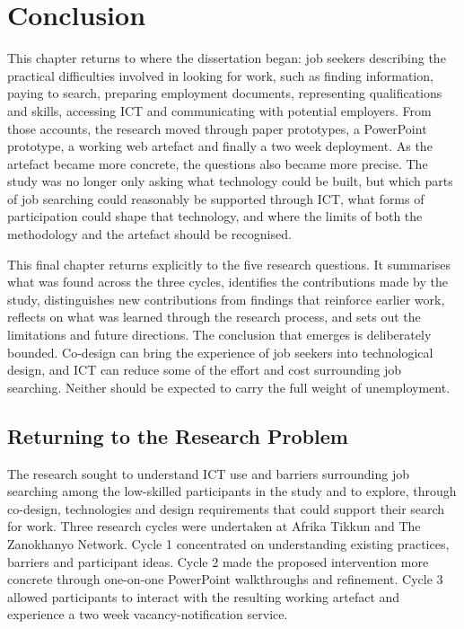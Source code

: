 \chapter{Conclusion}

\begin{chapterintro}
This chapter returns to where the dissertation began: job seekers describing the practical difficulties involved in looking for work, such as finding information, paying to search, preparing employment documents, representing qualifications and skills, accessing ICT and communicating with potential employers. From those accounts, the research moved through paper prototypes, a PowerPoint prototype, a working web artefact and finally a two week deployment. As the artefact became more concrete, the questions also became more precise. The study was no longer only asking what technology could be built, but which parts of job searching could reasonably be supported through ICT, what forms of participation could shape that technology, and where the limits of both the methodology and the artefact should be recognised.

This final chapter returns explicitly to the five research questions. It summarises what was found across the three cycles, identifies the contributions made by the study, distinguishes new contributions from findings that reinforce earlier work, reflects on what was learned through the research process, and sets out the limitations and future directions. The conclusion that emerges is deliberately bounded. Co-design can bring the experience of job seekers into technological design, and ICT can reduce some of the effort and cost surrounding job searching. Neither should be expected to carry the full weight of unemployment.
\end{chapterintro}


\section{Returning to the Research Problem}

The research sought to understand ICT use and barriers surrounding job searching among the low-skilled participants in the study and to explore, through co-design, technologies and design requirements that could support their search for work. Three research cycles were undertaken at Afrika Tikkun and The Zanokhanyo Network. Cycle 1 concentrated on understanding existing practices, barriers and participant ideas. Cycle 2 made the proposed intervention more concrete through one-on-one PowerPoint walkthroughs and refinement. Cycle 3 allowed participants to interact with the resulting working artefact and experience a two week vacancy-notification service.

